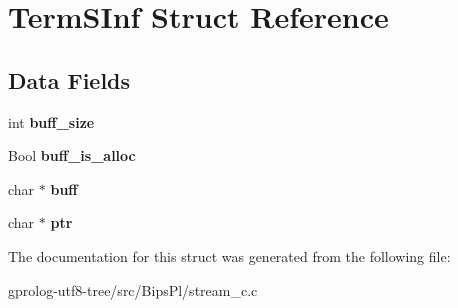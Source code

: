\hypertarget{structTermSInf}{}\section{Term\+S\+Inf Struct Reference}
\label{structTermSInf}
\subsection*{Data Fields}
\begin{DoxyCompactItemize}
\item 
int {\bfseries buff\+\_\+size}\hypertarget{structTermSInf_aa2ac007b499e0cb03e17072299872d08}{}\label{structTermSInf_aa2ac007b499e0cb03e17072299872d08}

\item 
Bool {\bfseries buff\+\_\+is\+\_\+alloc}\hypertarget{structTermSInf_a02d37582809df8e6a18bf4cdcb598693}{}\label{structTermSInf_a02d37582809df8e6a18bf4cdcb598693}

\item 
char $\ast$ {\bfseries buff}\hypertarget{structTermSInf_aea3421d8fe398941f9280da64bcfba35}{}\label{structTermSInf_aea3421d8fe398941f9280da64bcfba35}

\item 
char $\ast$ {\bfseries ptr}\hypertarget{structTermSInf_a46ab1bf8caba7bd0044429601be6b670}{}\label{structTermSInf_a46ab1bf8caba7bd0044429601be6b670}

\end{DoxyCompactItemize}


The documentation for this struct was generated from the following file\+:\begin{DoxyCompactItemize}
\item 
gprolog-\/utf8-\/tree/src/\+Bips\+Pl/stream\+\_\+c.\+c\end{DoxyCompactItemize}
